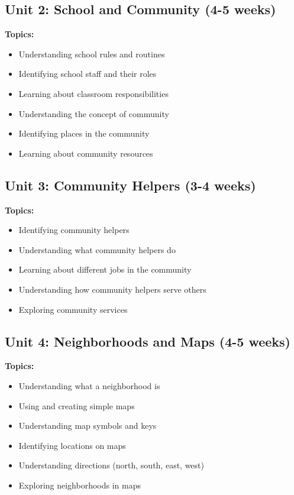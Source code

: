 \documentclass[11pt,letterpaper]{report}
\begin{document}
\subsection{Unit 2: School and Community (4-5 weeks)}

\textbf{Topics:}
\begin{itemize}
    \item Understanding school rules and routines
    \item Identifying school staff and their roles
    \item Learning about classroom responsibilities
    \item Understanding the concept of community
    \item Identifying places in the community
    \item Learning about community resources
\end{itemize}

\subsection{Unit 3: Community Helpers (3-4 weeks)}

\textbf{Topics:}
\begin{itemize}
    \item Identifying community helpers
    \item Understanding what community helpers do
    \item Learning about different jobs in the community
    \item Understanding how community helpers serve others
    \item Exploring community services
\end{itemize}

\subsection{Unit 4: Neighborhoods and Maps (4-5 weeks)}

\textbf{Topics:}
\begin{itemize}
    \item Understanding what a neighborhood is
    \item Using and creating simple maps
    \item Understanding map symbols and keys
    \item Identifying locations on maps
    \item Understanding directions (north, south, east, west)
    \item Exploring neighborhoods in maps
\end{itemize}
\end{document}
